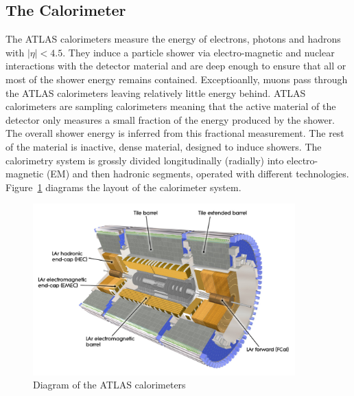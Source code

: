 \subsection{The Calorimeter}

The ATLAS calorimeters measure the energy of electrons, photons and hadrons with $|\eta|<4.5$. They induce a particle shower via electro-magnetic and nuclear interactions with the detector material and are deep enough to ensure that all or most of the shower energy remains contained. Exceptioanlly, muons pass through the ATLAS calorimeters leaving relatively little energy behind. ATLAS calorimeters are sampling calorimeters meaning that the active material of the detector only measures a small fraction of the energy produced by the shower. The overall shower energy is inferred from this fractional measurement. The rest of the material is inactive, dense material, designed to induce showers. The calorimetry system is grossly divided longitudinally (radially) into electro-magnetic (EM) and then hadronic segments, operated with different technologies. Figure~\ref{figure:lhc_calo} diagrams the layout of the calorimeter system.

\begin{figure}[!t]
\centering 
\includegraphics[width=0.9\textwidth]{figs/lhc/Calorimeter-eps-converted-to}
\caption{Diagram of the ATLAS calorimeters}
\label{figure:lhc_calo}
\end{figure}


